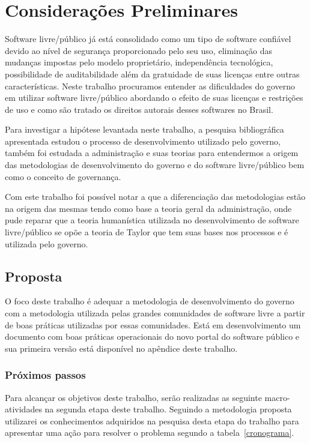 \chapter{Considerações Preliminares}
\label{consideracoes}

Software livre/público já está consolidado como um tipo de software confiável 
devido ao nível de segurança proporcionado pelo seu uso, eliminação das mudanças
impostas pelo modelo proprietário, independência tecnológica, possibilidade de
auditabilidade além da gratuidade de suas licenças entre outras características.
%
Neste trabalho procuramos entender as dificuldades do governo em utilizar software
livre/público abordando o efeito de suas licenças e restrições de uso e como são 
tratado os direitos autorais desses softwares no Brasil.

Para investigar a hipótese levantada neste trabalho, a pesquisa bibliográfica 
apresentada estudou o processo de desenvolvimento utilizado pelo governo, também foi 
estudada a administração e suas teorias para entendermos a origem das metodologias
de desenvolvimento do governo e do software livre/público bem como o conceito de 
governança.

Com este trabalho foi possível notar a que a diferenciação das metodologias estão
na origem das mesmas tendo como base a teoria geral da administração, onde pude reparar
que a teoria humanística utilizada no desenvolvimento de software livre/público se
opõe a teoria de Taylor que tem suas bases nos processos e é utilizada pelo governo.

\section{Proposta}

O foco deste trabalho é adequar a metodologia de desenvolvimento do governo com a
metodologia utilizada pelas grandes comunidades de software livre a partir de boas 
práticas utilizadas por essas comunidades.
Está em desenvolvimento um documento com boas práticas operacionais do novo portal 
do software público e sua primeira versão está disponível no apêndice deste trabalho. 

\subsection{Próximos passos}

Para alcançar os objetivos deste trabalho, serão realizadas as seguinte macro-atividades
na segunda etapa deste trabalho. Seguindo a metodologia proposta utilizarei os conhecimentos
adquiridos na pesquisa desta etapa do trabalho para apresentar uma ação para resolver o 
problema segundo a tabela~\ref{cronograma}.

